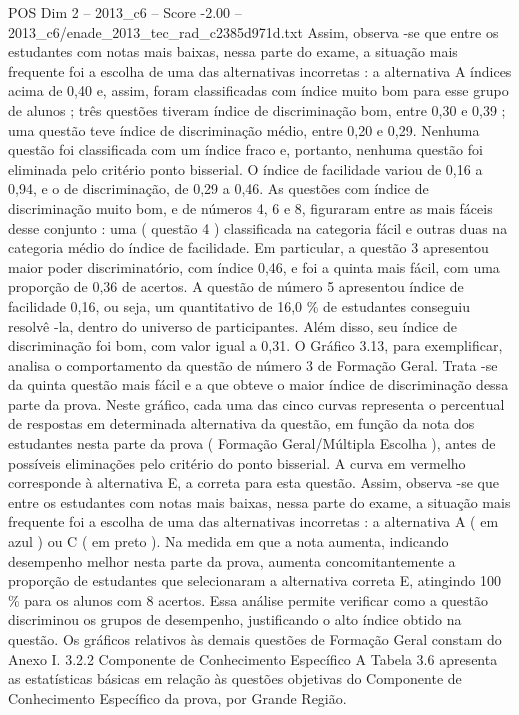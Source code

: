 \begin{textsample}{POS Dim 2 – 2013\_c6 – Score -2.00 – 2013\_c6/enade\_2013\_tec\_rad\_c2385d971d.txt}
Assim, observa -se que entre os estudantes com notas mais baixas, nessa parte do exame, a situação mais frequente foi a escolha de uma das alternativas incorretas : a alternativa A índices acima de 0,40 e, assim, foram classificadas com índice muito bom para esse grupo de alunos ; três questões tiveram índice de discriminação bom, entre 0,30 e 0,39 ; uma questão teve índice de discriminação médio, entre 0,20 e 0,29.
Nenhuma questão foi classificada com um índice fraco e, portanto, nenhuma questão foi eliminada pelo critério ponto bisserial.
O índice de facilidade variou de 0,16 a 0,94, e o de discriminação, de 0,29 a 0,46.
As questões com índice de discriminação muito bom, e de números 4, 6 e 8, figuraram entre as mais fáceis desse conjunto : uma ( questão 4 ) classificada na categoria fácil e outras duas na categoria médio do índice de facilidade.
Em particular, a questão 3 apresentou maior poder discriminatório, com índice 0,46, e foi a quinta mais fácil, com uma proporção de 0,36 de acertos.
A questão de número 5 apresentou índice de facilidade 0,16, ou seja, um quantitativo de 16,0 \% de estudantes conseguiu resolvê -la, dentro do universo de participantes.
Além disso, seu índice de discriminação foi bom, com valor igual a 0,31.
O Gráfico 3.13, para exemplificar, analisa o comportamento da questão de número 3 de Formação Geral.
Trata -se da quinta questão mais fácil e a que obteve o maior índice de discriminação dessa parte da prova.
Neste gráfico, cada uma das cinco curvas representa o percentual de respostas em determinada alternativa da questão, em função da nota dos estudantes nesta parte da prova ( Formação Geral/Múltipla Escolha ), antes de possíveis eliminações pelo critério do ponto bisserial.
A curva em vermelho corresponde à alternativa E, a correta para esta questão.
Assim, observa -se que entre os estudantes com notas mais baixas, nessa parte do exame, a situação mais frequente foi a escolha de uma das alternativas incorretas : a alternativa A ( em azul ) ou C ( em preto ).
Na medida em que a nota aumenta, indicando desempenho melhor nesta parte da prova, aumenta concomitantemente a proporção de estudantes que selecionaram a alternativa correta E, atingindo 100 \% para os alunos com 8 acertos.
Essa análise permite verificar como a questão discriminou os grupos de desempenho, justificando o alto índice obtido na questão.
Os gráficos relativos às demais questões de Formação Geral constam do Anexo I. 3.2.2 Componente de Conhecimento Específico A Tabela 3.6 apresenta as estatísticas básicas em relação às questões objetivas do Componente de Conhecimento Específico da prova, por Grande Região.

\end{textsample}
